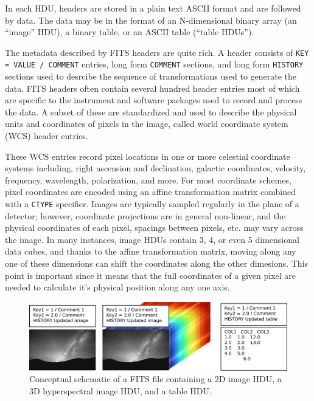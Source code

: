 \documentclass{juliacon}
\begin{document}
In each HDU,
headers are stored in a plain text ASCII format and are followed by data.
The data may be in the format of an N-dimensional binary array (an ``image'' HDU),
a binary table,
or an ASCII table (``table HDUs'').


The metadata described by FITS headers are quite rich.
A header consists of \verb|KEY = VALUE / COMMENT| entries, long form \verb|COMMENT| sections,
and long form \verb|HISTORY| sections used to desrcibe the sequence of transformations used to generate the data.
FITS headers often contain several hundred header entries most of which are specific to the instrument and software packages used to record and process the data.
A subset of these are standardized and used to describe the physical units and coordinates of pixels in the image, called world coordinate system (WCS) header entries.


These WCS entries record pixel locations in one or more celestial coordinate systems including, right ascension and declination, galactic coordinates, velocity, frequency, wavelength, polarization, and more.
For most coordinate schemes, pixel coordinates are encoded using an affine transformation matrix combined with a \verb|CTYPE| specifier. Images are typically sampled regularly in the plane of a detector; however, coordinate projections are in general non-linear, and the physical coordinates of each pixel, spacings between pixels, etc. may vary across the image.
In many instances, image HDUs contain 3, 4, or even 5 dimensional data cubes, and thanks to the affine transformation matrix, moving along any one of these dimensions can shift the coordinates along the other dimesions. This point is important since it means that the full coordinates of a given pixel are needed to calculate it's physical position along any one axis.


\begin{figure}[t]
    \centerline{\includegraphics[width=\columnwidth]{fits-schematic.pdf}}
    \caption{Conceptual schematic of a FITS file containing a 2D image HDU, a 3D hyperspectral image HDU, and a table HDU.}
        \label{fig:fits-schematic}
\end{figure}
\end{document}
